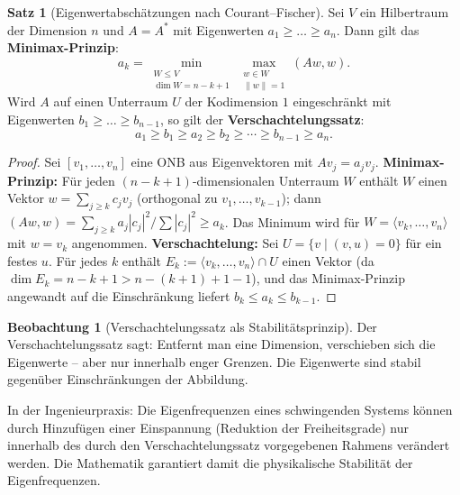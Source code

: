 ﻿\documentclass[a4paper,12pt]{report}
\theoremstyle{definition}
\newtheorem{satz}{Satz}
\newtheorem{beobachtung}{Beobachtung}
\begin{document}
\begin{satz}[Eigenwertabschätzungen nach Courant--Fischer]
    Sei $V$ ein Hilbertraum der Dimension $n$ und $A = A^*$ mit
    Eigenwerten $a_1 \geq \dots \geq a_n$. Dann gilt das
    \textbf{Minimax-Prinzip}:
    \[
        a_k = \min_{\substack{W \leq V \\ \dim W = n-k+1}}
        \max_{\substack{w \in W \\ \|w\| = 1}} (Aw, w).
    \]
    Wird $A$ auf einen Unterraum $U$ der Kodimension $1$ eingeschränkt
    mit Eigenwerten $b_1 \geq \dots \geq b_{n-1}$, so gilt der
    \textbf{Verschachtelungssatz}:
    \[
        a_1 \geq b_1 \geq a_2 \geq b_2 \geq \cdots \geq b_{n-1} \geq a_n.
    \]
\end{satz}
\begin{proof}
    Sei $[v_1, \ldots, v_n]$ eine ONB aus Eigenvektoren mit $Av_j = a_j v_j$.
    \textbf{Minimax-Prinzip:} Für jeden $(n-k+1)$-dimensionalen Unterraum $W$
    enthält $W$ einen Vektor $w = \sum_{j \geq k} c_j v_j$ (orthogonal zu
    $v_1, \ldots, v_{k-1}$); dann $(Aw, w) = \sum_{j \geq k} a_j |c_j|^2
    / \sum |c_j|^2 \geq a_k$. Das Minimum wird für $W = \langle v_k, \ldots, v_n \rangle$
    mit $w = v_k$ angenommen.
    \textbf{Verschachtelung:} Sei $U = \{v \mid (v, u) = 0\}$ für ein festes $u$.
    Für jedes $k$ enthält $E_k := \langle v_k, \ldots, v_n \rangle \cap U$
    einen Vektor (da $\dim E_k = n-k+1 > n - (k+1) + 1 - 1$), und das
    Minimax-Prinzip angewandt auf die Einschränkung liefert $b_k \leq a_k \leq b_{k-1}$.
\end{proof}


\begin{beobachtung}[Verschachtelungssatz als Stabilitätsprinzip]
    Der Verschachtelungssatz sagt: Entfernt man eine Dimension,
    verschieben sich die Eigenwerte -- aber nur innerhalb enger Grenzen.
    Die Eigenwerte sind stabil gegenüber Einschränkungen der Abbildung.

    In der Ingenieurpraxis: Die Eigenfrequenzen eines schwingenden Systems
    können durch Hinzufügen einer Einspannung (Reduktion der Freiheitsgrade)
    nur innerhalb des durch den Verschachtelungssatz vorgegebenen Rahmens
    verändert werden. Die Mathematik garantiert damit die physikalische
    Stabilität der Eigenfrequenzen.
\end{beobachtung}


\end{document}

